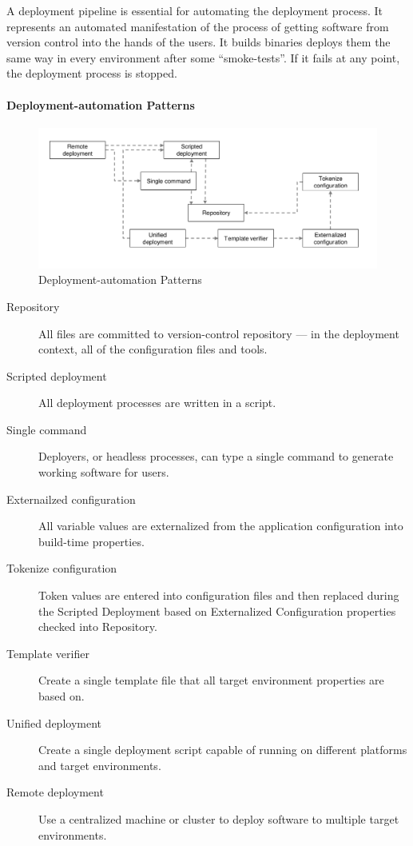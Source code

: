 A deployment pipeline is essential for automating the deployment process.
It represents an automated manifestation of the process of getting software from version control into the hands of the users.
It builds binaries deploys them the same way in every environment after some ``smoke-tests''.
If it fails at any point, the deployment process is stopped.

\paragraph{Deployment-automation Patterns}
\begin{figure}[H]
  \centering
  \includegraphics[width=.8\textwidth]{images/deployment_automation_patterns.png}
  \caption{Deployment-automation Patterns}
\end{figure}
\begin{description}
  \item[Repository] All files are committed to version-control repository — in the deployment context, all of the configuration files and tools.
  \item[Scripted deployment] All deployment processes are written in a script.
  \item[Single command] Deployers, or headless processes, can type a single command to generate working software for users.
  \item[Externailzed configuration] All variable values are externalized from the application configuration into build-time properties.
  \item[Tokenize configuration] Token values are entered into configuration files and then replaced during the Scripted Deployment based on Externalized Configuration properties checked into Repository.
  \item[Template verifier] Create a single template file that all target environment properties are based on.
  \item[Unified deployment] Create a single deployment script capable of running on different platforms and target environments.
  \item[Remote deployment] Use a centralized machine or cluster to deploy software to multiple target environments.
\end{description}

